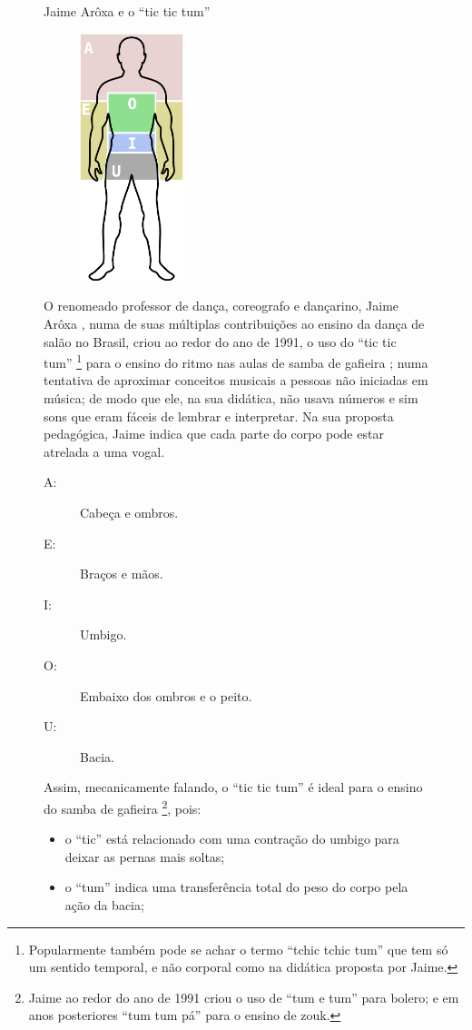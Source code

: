 \begin{figure}[hb!]
\begin{elaboracion}{Jaime Arôxa e o ``tic tic tum''}
\begin{figure}
\centering
\includegraphics[width=0.33\textwidth]{chapters/cap-musicalidade-percepcion/aroxa-tic-tic-tum.eps}
\end{figure}
O renomeado professor de dança, coreografo e  dançarino, Jaime Arôxa \cite{JaimeAroxaSite},
numa de suas múltiplas contribuições ao ensino da dança de salão no Brasil,
criou ao redor do ano de 1991, 
o uso do ``tic tic tum''
\footnote{Popularmente também pode se achar o termo ``tchic tchic tum'' que tem só um sentido temporal, 
e não corporal como na didática proposta por Jaime.} 
para o ensino do ritmo nas aulas de samba de gafieira \cite{EntrevistaJaimeAroxa1};
numa tentativa de aproximar conceitos musicais a pessoas não iniciadas em música;
de modo que ele, na sua didática, não usava números e sim sons que eram fáceis de lembrar e interpretar.
Na sua proposta pedagógica, 
Jaime indica que cada parte do corpo pode estar atrelada a uma vogal.
\begin{description} 
\item[A:] Cabeça e ombros. 
\item[E:] Braços e mãos. 
\item[I:] Umbigo.
\item[O:] Embaixo dos ombros e o peito.
\item[U:] Bacia.
\end{description}
Assim, mecanicamente falando, o ``tic tic tum'' é ideal para o ensino do samba de gafieira
\footnote{Jaime ao redor do ano de 1991 criou o uso de ``tum e tum'' para bolero;
e em anos posteriores ``tum tum pá'' para o ensino de zouk.},
pois:
\begin{itemize} 
\item o ``tic'' está relacionado com uma contração do umbigo para deixar as pernas mais soltas;
\item o ``tum'' indica uma transferência total do peso do corpo pela ação da bacia;
\end{itemize}



\end{elaboracion}
\end{figure}
